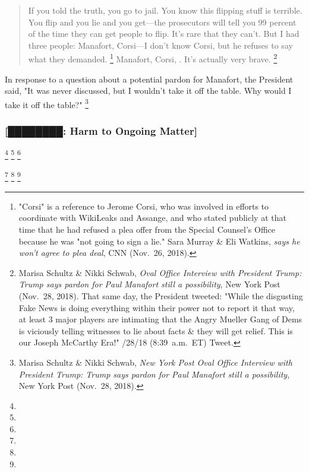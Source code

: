 \begin{quote}
If you told the truth, you go to jail.
You know this flipping stuff is terrible.
You flip and you lie and you get---the prosecutors will tell you 99 percent of the time they can get people to flip.
It's rare that they can't.
But I had three people: Manafort, Corsi---I don't know Corsi, but he refuses to say what they demanded.%
\footnote{"Corsi" is a reference to Jerome Corsi,  who was involved in efforts to coordinate with WikiLeaks and Assange, and who stated publicly at that time that he had refused a plea offer from the Special Counsel's Office because he was "not going to sign a lie."
Sara Murray \& Eli Watkins,  \textit{says he won't agree to plea deal}, CNN (Nov.~26, 2018).}
Manafort, Corsi, .
It's actually very brave.%
\footnote{Marisa Schultz \& Nikki Schwab, \textit{Oval Office Interview with President Trump: Trump says pardon for Paul Manafort still a possibility}, New York Post (Nov.~28, 2018).
That same day, the President tweeted: "While the disgusting Fake News is doing everything within their power not to report it that way, at least 3 major players are intimating that the Angry Mueller Gang of Dems is viciously telling witnesses to lie about facts \& they will get relief.
This is our Joseph McCarthy Era!" /28/18 (8:39~a.m.~ET) Tweet.}
\end{quote}

In response to a question about a potential pardon for Manafort, the President said, "It was never discussed, but I wouldn't take it off the table.
Why would I take it off the table?"%
\footnote{Marisa Schultz \& Nikki Schwab, \textit{New York Post Oval Office Interview with President Trump: Trump says pardon for Paul Manafort still a possibility}, New York Post (Nov.~28, 2018).}

\subsubsection{[████████: Harm to Ongoing Matter]}

\footnote{}
\footnote{}
\footnote{}

\footnote{}
\footnote{}
\footnote{}

